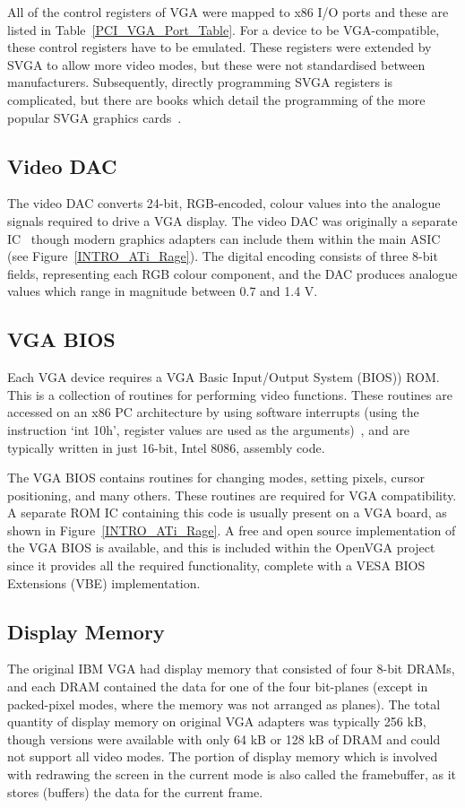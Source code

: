 All of the control registers of VGA were mapped to x86 I/O ports and these are
listed in Table~\ref{PCI_VGA_Port_Table}. For a device to be VGA-compatible,
these control registers have to be emulated. These registers were extended by
SVGA to allow more video modes, but these were not standardised between
manufacturers. Subsequently, directly programming SVGA registers is complicated,
but there are books which detail the programming of the more popular SVGA
graphics cards~\cite{SVGA_Book, VGA_Programmers}.


\subsection{Video DAC}
The video DAC converts 24-bit, RGB-encoded, colour values into the analogue
signals required to drive a VGA display. The video DAC was originally a
separate IC~\cite{VGA_Programmers, SVGA_Book} though modern graphics adapters
can include them within the main ASIC (see Figure~\ref{INTRO_ATi_Rage}). The
digital encoding consists of three 8-bit fields, representing each RGB colour
component, and the DAC produces analogue values which range in magnitude between
0.7 and 1.4 V.


\subsection{VGA BIOS}
Each VGA device requires a VGA Basic Input/Output System (BIOS)) ROM. This is a collection of
routines for performing video functions. These routines are accessed on an x86 PC
architecture by using software interrupts (using the instruction `int 10h',
register values are used as the arguments)~\cite{VGA_Programmers, SVGA_Book}, and
are typically written in just 16-bit, Intel 8086, assembly code.

The VGA BIOS contains routines for changing modes, setting pixels, cursor
positioning, and many others. These routines are required for VGA compatibility.
A separate ROM IC containing this code is usually present on a VGA board, as
shown in Figure~\ref{INTRO_ATi_Rage}. A free and open source implementation of
the VGA BIOS is available, and this is included within the OpenVGA project since
it provides all the required functionality, complete with a VESA BIOS Extensions
(VBE) implementation.


\subsection{Display Memory}
\label{VGA_Display_Memory}
The original IBM VGA had display memory that consisted of four 8-bit DRAMs, and
each DRAM contained the data for one of the four bit-planes (except in
packed-pixel modes, where the memory was not arranged as planes). The total
quantity of display memory on original VGA adapters was typically 256 kB, though
versions were available with only 64 kB or 128 kB of DRAM and could not support
all video modes. The portion of display memory which is involved with redrawing
the screen in the current mode is also called the framebuffer, as it stores
(buffers) the data for the current frame.

